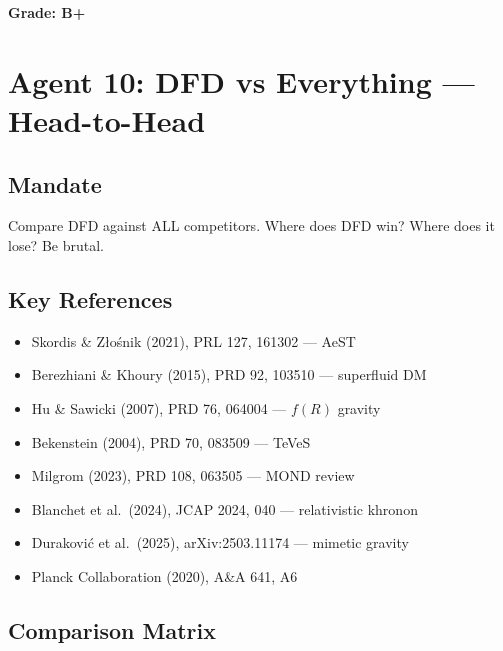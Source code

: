 \documentclass[11pt,a4paper]{article}
\begin{document}
\textbf{Grade: B+}

\section{Agent 10: DFD vs Everything --- Head-to-Head}
\label{sec:agent10}

\subsection{Mandate}

Compare DFD against ALL competitors. Where does DFD win? Where does it lose? Be brutal.

\subsection{Key References}

\begin{itemize}
\item Skordis \& Z{\l}o\'{s}nik (2021), PRL 127, 161302 --- AeST
\item Berezhiani \& Khoury (2015), PRD 92, 103510 --- superfluid DM
\item Hu \& Sawicki (2007), PRD 76, 064004 --- $f(R)$ gravity
\item Bekenstein (2004), PRD 70, 083509 --- TeVeS
\item Milgrom (2023), PRD 108, 063505 --- MOND review
\item Blanchet et al.\ (2024), JCAP 2024, 040 --- relativistic khronon
\item Durakovi\'{c} et al.\ (2025), arXiv:2503.11174 --- mimetic gravity
\item Planck Collaboration (2020), A\&A 641, A6
\end{itemize}

\subsection{Comparison Matrix}
\end{document}
